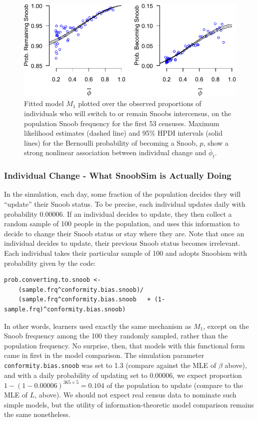 \begin{figure}[t]
\begin{center}
\includegraphics[scale=1]{figures/rtdice/ichange.pdf}
\caption{Fitted model $M_1$ plotted over the observed proportions of individuals who will switch to or remain Snoobs intercensus, on the population Snoob frequency for the first 53 censuses.  Maximum likelihood estimates (dashed line) and 95\% HPDI intervals (solid lines) for the Bernoulli probability of becoming a Snoob, $p$, show a strong nonlinear association between individual change and $\overline{\phi}_t$.}
\label{fig:ichange}
\end{center}
\end{figure}


\subsubsection{Individual Change - What SnoobSim is Actually Doing}

In the simulation, each day, some fraction of the population decides they will ``update'' their Snoob status.  To be precise, each individual updates daily with probability 0.00006.  If an individual decides to update, they then collect a random sample of 100 people in the population, and uses this information to decide to change their Snoob status or stay where they are.  Note that once an individual decides to update, their previous Snoob status becomes irrelevant.  Each individual takes their particular sample of 100 and adopts Snoobism with probability given by the code:

\begin{verbatim}
prob.converting.to.snoob <- 
	(sample.frq^conformity.bias.snoob)/
	(sample.frq^conformity.bias.snoob	+ (1-sample.frq)^conformity.bias.snoob)
\end{verbatim}

In other words, learners used exactly the same mechanism as $M_1$, except on the Snoob frequency among the 100 they randomly sampled, rather than the population frequency.  No surprise, then, that models with this functional form came in first in the model comparison.  The simulation parameter \texttt{conformity.bias.snoob} was set to 1.3 (compare against the MLE of $\beta$ above), and with a daily probability of updating set to 0.00006, we expect proportion $1-(1-0.00006)^{365\times5}=0.104$ of the population to update (compare to the MLE of $L$, above).  We should not expect real census data to nominate such simple models, but the utility of information-theoretic model comparison remains the same nonetheless.



